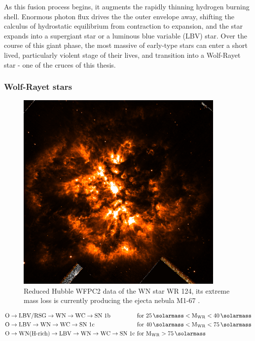As this fusion process begins, it augments the rapidly thinning hydrogen burning shell.
Enormous photon flux drives the the outer envelope away, shifting the calculus of hydrostatic equilibrium from contraction to expansion, and the star expands into a supergiant star or a luminous blue variable (LBV) star.
Over the course of this giant phase, the most massive of early-type stars can enter a short lived, particularly violent stage of their lives, and transition into a Wolf-Rayet star - one of the cruces of this thesis.

\subsubsection{Wolf-Rayet stars}
\label{sec:wrtype}

\begin{figure}[h]
  \centering
  \includegraphics[width=4in]{assets/WR124.png}
  \caption[\textit{M1-67 nebula around WR 124 \parencite{2010ApJ...724L..90M}}]{Reduced Hubble WFPC2 data of the WN star WR 124, its extreme mass loss is currently producing the ejecta nebula M1-67 \parencite{2010ApJ...724L..90M}.}
  \label{fig:wr124}
\end{figure}

\textcite{crowther_physical_2007}

\begin{equation}
  \begin{alignedat}{3}
    \text{O} & \rightarrow \text{LBV/RSG} \rightarrow \text{WN} \rightarrow \text{WC} \rightarrow \text{SN 1b} && \text{ for } 25 \, \si{\solarmass} < \text{M}_{\text{WR}} < 40 \, \si{\solarmass} \\
    \text{O} & \rightarrow \text{LBV} \rightarrow \text{WN} \rightarrow \text{WC} \rightarrow \text{SN 1c} && \text{ for } 40 \, \si{\solarmass} < \text{M}_{\text{WR}} < 75 \, \si{\solarmass} \\
    \text{O} & \rightarrow \text{WN(H-rich)} \rightarrow \text{LBV} \rightarrow \text{WN} \rightarrow \text{WC} \rightarrow \text{SN 1c} && \text{ for } \text{M}_{\text{WR}} > 75 \, \si{\solarmass} 
  \end{alignedat}  
\end{equation}




